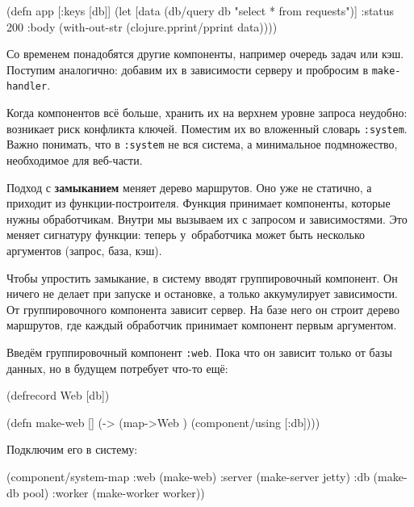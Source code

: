 \else

\begin{english}
  \begin{clojure}
(defn app [{:keys [db]}]
  (let [data (db/query db "select * from requests")]
    {:status 200
     :body (with-out-str
             (clojure.pprint/pprint data))}))
  \end{clojure}
\end{english}

\fi

Со временем понадобятся другие компоненты, например очередь задач или
кэш. Поступим аналогично: добавим их в зависимости серверу и пробросим в
\verb|make-handler|.


Когда компонентов всё больше, хранить их на верхнем уровне запроса неудобно:
возникает риск конфликта ключей. Поместим их во вложенный словарь
\verb|:system|. Важно понимать, что в \verb|:system| не вся система, а
минимальное подмножество, необходимое для веб-части.


Подход с \textbf{замыканием} меняет дерево маршрутов. Оно уже не статично, а
приходит из функции-построителя. Функция принимает компоненты, которые нужны
обработчикам. Внутри мы вызываем их с запросом и зависимостями. Это меняет
сигнатуру функции: теперь у~обработчика может быть несколько аргументов (запрос,
база, кэш).

Чтобы упростить замыкание, в систему вводят группировочный компонент. Он ничего
не делает при запуске и остановке, а только аккумулирует зависимости. От
группировочного компонента зависит сервер. На базе него он строит дерево
маршрутов, где каждый обработчик принимает компонент первым аргументом.

Введём группировочный компонент \verb|:web|. Пока что он зависит только от
базы данных, но в будущем потребует что-то ещё:

\begin{english}
  \begin{clojure}
(defrecord Web [db])

(defn make-web []
  (-> (map->Web {})
      (component/using [:db])))
  \end{clojure}
\end{english}

\noindent
Подключим его в систему:

\begin{english}
  \begin{clojure}
(component/system-map
 :web    (make-web)
 :server (make-server jetty)
 :db     (make-db pool)
 :worker (make-worker worker))
  \end{clojure}
\end{english}

